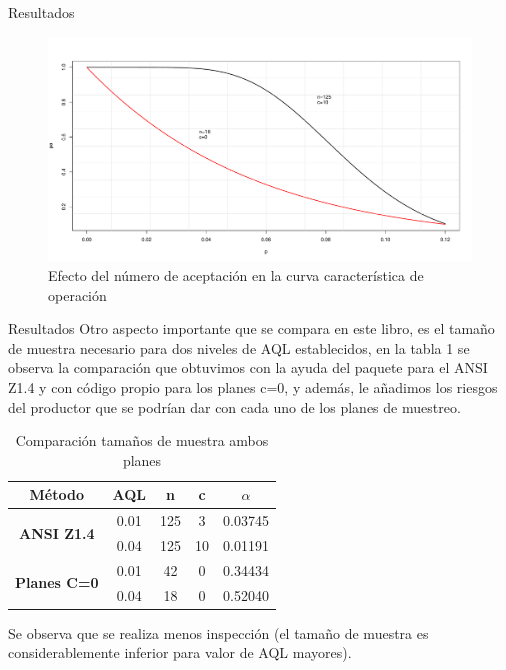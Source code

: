 \documentclass[10pt]{beamer}
\begin{document}
\begin{frame}{Resultados}
\begin{figure}[h!]
  \centering
  \includegraphics[scale=0.33]{FigurasUV/Figura2.pdf}
  \caption{Efecto del número de aceptación en la curva característica de operación}
\end{figure}
\end{frame}

\begin{frame}{Resultados}
Otro aspecto importante que se compara en este libro, es el tamaño de muestra necesario para dos niveles de AQL establecidos, en la tabla 1 se observa la comparación que obtuvimos con la ayuda del paquete \cite{AyR} para el ANSI Z1.4 y con código propio para los planes c=0, y además, le añadimos los riesgos del productor que se podrían dar con cada uno de los planes de muestreo.

\begin{table}[htbp]
  \centering
    \begin{tabular}{c|c|c|c|c}
    \hline
    \textbf{Método} & \textbf{AQL} & \textbf{n} & \textbf{c} & \textbf{$\alpha$} \\
    \hline
    \multirow{2}[2]{*}{\textbf{ANSI Z1.4}} & 0.01  & 125   & 3     & 0.03745 \\
          & 0.04  & 125   & 10    & 0.01191 \\
    \hline
    \multirow{2}[2]{*}{\textbf{Planes C=0}} & 0.01  & 42    & 0     & 0.34434 \\
          & 0.04  & 18    & 0     & 0.52040 \\
    \hline
    \end{tabular}%
    \caption{Comparación tamaños de muestra ambos planes}
  \label{tab:addlabel}%
\end{table}%
Se observa que se realiza menos inspección (el tamaño de muestra es considerablemente inferior para valor de AQL mayores). 
\end{frame}
\end{document}
